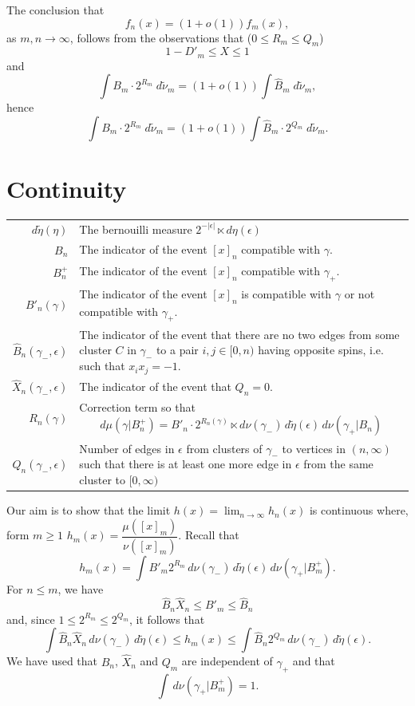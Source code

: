 \documentclass[11pt, a4paper, oneside]{scrartcl}
\theoremstyle{definition}
\theoremstyle{remark}
\renewcommand{\d}{\,d}
\providecommand{\ordo}[1]{{o(#1)}}
\providecommand{\e}{\epsilon}
\providecommand{\tl}{\tilde}
\providecommand{\g}{\gamma}
\begin{document}
The conclusion that $$f_n(x)=(1+\ordo{1})f_m(x),$$
as $m,n \to \infty$, follows from the observations that ($0\leq R_m \leq Q_m$)
$$1-D'_m\leq X\leq 1$$
and
$$\int B_m \cdot 2^{R_m} \; d\tilde \nu_m =(1+\ordo{1})\int \hat B_m \; d\tilde \nu_m,$$
hence
$$\int B_m \cdot 2^{R_m} \; d\tilde \nu_m =(1+\ordo{1})\int \hat B_m \cdot 2^{Q_m} \; d\tilde \nu_m.$$



\section{Continuity}

\begin{center}
\begin{tabular}{rp{}}
  $d\tilde\eta(\eta)$ & The bernouilli measure $2^{-|\e|}\ltimes d\eta(\e)$ \\
  $B_n$  & The indicator of the event $[x]_n$ compatible with $\g$. \\
  $B_n^+$  & The indicator of the event $[x]_n$ compatible with $\g_+$. \\
  $B'_n(\g)$ & The indicator of the event $[x]_n$ is
               compatible with $\g$ or not compatible with $\g_+$. \\
  $\hat B_n(\g_-,\e)$ & The indicator of the event that there are
                   no two edges from some cluster $C$ in $\g_-$
                   to a pair $i,j\in[0,n)$ having opposite spins,
                   i.e. such that $x_i x_j = -1$. \\
  $\hat X_n(\g_-,\e)$ & The indicator of the event that $Q_n=0$. \\
  $R_n(\g)$ & Correction term so that
              $$ d\mu(\g|B^+_n) = B'_n \cdot 2^{R_n(\g)} \ltimes
              d\nu(\g_-) \d\tilde\eta(\e) \d\nu(\g_+|B_n) $$ \\
  $Q_n(\g_-,\e)$ & Number of edges in $\e$ from clusters of $\g_-$ to vertices in $(n,\infty)$
                   such that there is at least one more edge in $\e$ from the same cluster to $[0,\infty)$
\end{tabular}
\end{center}


Our aim is to show that the limit $h(x)=\lim_{n\to\infty} h_n(x)$ is continuous where, form $m\ge1$
\(h_m(x) = \dfrac{\mu([x]_m)}{\nu([x]_m)}\).
Recall that
\begin{equation}\label{eq:3}
  h_m(x) =  \int B'_m 2^{R_m} \d \nu(\g_-)\d\tl\eta(\e) \d \nu(\g_+|B_m^+).
\end{equation}
For $n\le m$, we have
$$ \hat B_n \hat X_n \le B'_m \le \hat B_n $$
and, since $1\le 2^{R_m}\le 2^{Q_m}$, it follows that
\begin{equation}
  \label{eq:4}
  \int \hat B_n \hat X_n \d \nu(\g_-) \d\tl\eta(\e)
  \le h_m(x) \le \int \hat B_n 2^{Q_m} \d\nu(\g_-) \d\tl\eta(\e).
\end{equation}
We have used that $\hat B_n$, $\hat X_n$ and $Q_m$ are independent of $\g_+$ and that
$$\int\d\nu(\g_+|B_m^+)=1. $$
\end{document}
